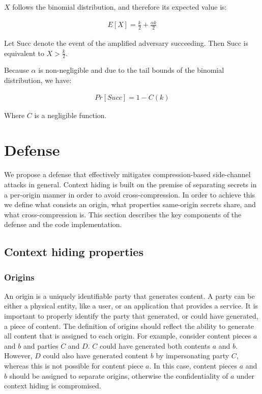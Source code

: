 \documentclass[conference, letterpaper, 10pt]{IEEEtran}
\begin{document}
\begin{IEEEproof}
$X$ follows the binomial distribution, and therefore its expected value is:

\begin{align*}
    E[X] = \frac{k}{2} + \frac{\alpha k}{2}
\end{align*}

Let Succ denote the event of the amplified adversary succeeding. Then Succ
is equivalent to $X > \frac{k}{2}$.

Because $\alpha$ is non-negligible and due to the tail bounds of the binomial
distribution, we have:

\begin{align*}
    Pr[Succ] = 1 - C(k)
\end{align*}

Where $C$ is a negligible function.
\end{IEEEproof}

\section{Defense}\label{sec:defense}
We propose a defense that effectively mitigates compression-based side-channel
attacks in general.  Context hiding is built on the premise of separating
secrets in a per-origin manner in order to avoid cross-compression. In order to
achieve this we define what consists an origin, what properties same-origin
secrets share, and what cross-compression is. This section describes the key
components of the defense and the code implementation.

\subsection{Context hiding properties}

\subsubsection{Origins}
An origin is a uniquely identifiable party that generates content. A party can
be either a physical entity, like a user, or an application that provides a
service. It is important to properly identify the party that generated, or could
have generated, a piece of content. The definition of origins should reflect the
ability to generate all content that is assigned to each origin. For example,
consider content pieces $a$ and $b$ and parties $C$ and $D$. $C$ could have
generated both contents $a$ and $b$. However, $D$ could also have generated
content $b$ by impersonating party $C$, whereas this is not possible for content
piece $a$. In this case, content pieces $a$ and $b$ should be assigned to
separate origins, otherwise the confidentiality of $a$ under context hiding is
compromised.
\end{document}
